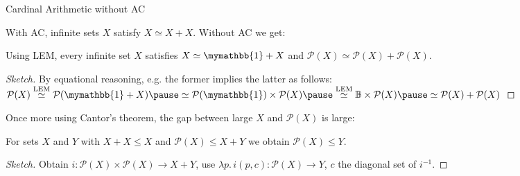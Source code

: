 \documentclass[xcolor=dvipsnames,compress,aspectratio=169,handout]{beamer}
\newcommand{\MBB}[1]{\ensuremath{\mathbb{#1}}\xspace}  %
\newcommand{\MCL}[1]{\ensuremath{\mathcal{#1}}\xspace} %
\newcommand{\Bool}{\MBB{B}}  %
\newcommand{\Unit}{\mymathbb{1}}  %
\newcommand{\Pow}{\MCL P}
\begin{document}
\begin{frame}{Cardinal Arithmetic without AC}

With AC, infinite sets $X$ satisfy $X\simeq X+X$. Without AC we get:

\begin{lemma}
	Using LEM, every infinite set $X$ satisfies $X\simeq\Unit+X$ and $\Pow(X)\simeq\Pow(X)+\Pow(X)$.
\end{lemma}
\vspace{-0.1cm}
\begin{proof}[Sketch]
	By equational reasoning, e.g. the former implies the latter as follows:
	$\Pow(X)\overset{\textnormal{LEM}}\simeq\Pow(\Unit+X)\pause\simeq\Pow(\Unit)\times \Pow (X)\pause\overset{\textnormal{LEM}}\simeq\Bool\times \Pow(X)\pause\simeq \Pow(X)+\Pow(X)$
\end{proof}

\vspace{0.3cm}
Once more using Cantor's theorem, the gap between large $X$ and $\Pow(X)$ is large:
\begin{lemma}
	For sets $X$ and $Y$ with $X+X\le X$ and $\Pow (X)\le X+Y$ we obtain $\Pow (X)\le Y$.
\end{lemma}
\vspace{-0.1cm}
\begin{proof}[Sketch]
	Obtain $i:\Pow (X)\times\Pow (X)\to X+Y$, use $\lambda p.\, i(p,c):\Pow (X)\to Y$, $c$ the diagonal set of $i^{-1}$.
\end{proof}

\end{frame}
\end{document}
